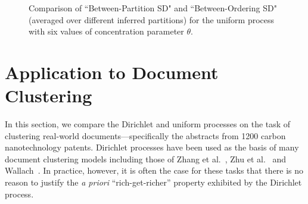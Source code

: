\documentclass{article}
\begin{document}
\begin{figure}[t]
\vspace{-0.5cm}
\centering
{}
\caption{Comparison of ``Between-Partition SD" and ``Between-Ordering
  SD" (averaged over different inferred partitions) for the uniform
  process with six values of concentration parameter
  $\theta$.}\label{orderingfig}
\vspace{-0.4cm}
\end{figure}


\section{Application to Document Clustering}\label{application}

In this section, we compare the Dirichlet and uniform processes on the
task of clustering real-world documents---specifically the abstracts
from 1200 carbon nanotechnology patents.  Dirichlet processes have
been used as the basis of many document clustering models including
those of Zhang et al.~\cite{ZhaGhaYan05}, Zhu et
al.~\cite{ZhuGhaLaf05} and Wallach~\cite{Wal08}. In practice, however,
it is often the case for these tasks that there is no reason to
justify the \emph{a priori} ``rich-get-richer'' property exhibited by
the Dirichlet process.
\end{document}
